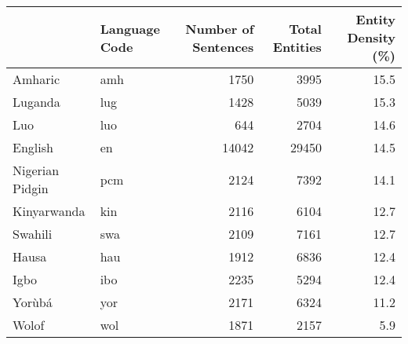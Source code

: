 \begin{tabular}{llrrr}
\toprule
{} & Language Code &  Number of Sentences &  Total Entities &  Entity Density (\%) \\
\midrule
Amharic         &           amh &                 1750 &            3995 &                15.5 \\
Luganda         &           lug &                 1428 &            5039 &                15.3 \\
Luo             &           luo &                  644 &            2704 &                14.6 \\
English         &            en &                14042 &           29450 &                14.5 \\
Nigerian Pidgin &           pcm &                 2124 &            7392 &                14.1 \\
Kinyarwanda     &           kin &                 2116 &            6104 &                12.7 \\
Swahili         &           swa &                 2109 &            7161 &                12.7 \\
Hausa           &           hau &                 1912 &            6836 &                12.4 \\
Igbo            &           ibo &                 2235 &            5294 &                12.4 \\
Yorùbá          &           yor &                 2171 &            6324 &                11.2 \\
Wolof           &           wol &                 1871 &            2157 &                 5.9 \\
\bottomrule
\end{tabular}
